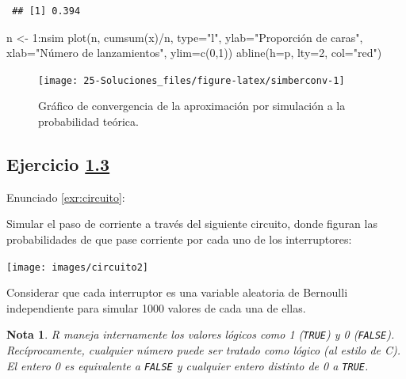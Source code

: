 \documentclass[
]{book}
\newenvironment{Shaded}{\begin{snugshade}}{\end{snugshade}}
\newcommand{\AttributeTok}[1]{\textcolor[rgb]{0.77,0.63,0.00}{#1}}
\newcommand{\DecValTok}[1]{\textcolor[rgb]{0.00,0.00,0.81}{#1}}
\newcommand{\FunctionTok}[1]{\textcolor[rgb]{0.00,0.00,0.00}{#1}}
\newcommand{\NormalTok}[1]{#1}
\newcommand{\OtherTok}[1]{\textcolor[rgb]{0.56,0.35,0.01}{#1}}
\newcommand{\SpecialCharTok}[1]{\textcolor[rgb]{0.00,0.00,0.00}{#1}}
\newcommand{\StringTok}[1]{\textcolor[rgb]{0.31,0.60,0.02}{#1}}
\theoremstyle{break}
\theoremstyle{nonumberplain}
\newtheorem{remark}{Nota}
\begin{document}
\begin{verbatim}
 ## [1] 0.394
\end{verbatim}

\begin{Shaded}
\begin{Highlighting}[]
\NormalTok{n }\OtherTok{\textless{}{-}} \DecValTok{1}\SpecialCharTok{:}\NormalTok{nsim}
\FunctionTok{plot}\NormalTok{(n, }\FunctionTok{cumsum}\NormalTok{(x)}\SpecialCharTok{/}\NormalTok{n, }\AttributeTok{type=}\StringTok{"l"}\NormalTok{, }\AttributeTok{ylab=}\StringTok{"Proporción de caras"}\NormalTok{, }
     \AttributeTok{xlab=}\StringTok{"Número de lanzamientos"}\NormalTok{, }\AttributeTok{ylim=}\FunctionTok{c}\NormalTok{(}\DecValTok{0}\NormalTok{,}\DecValTok{1}\NormalTok{))}
\FunctionTok{abline}\NormalTok{(}\AttributeTok{h=}\NormalTok{p, }\AttributeTok{lty=}\DecValTok{2}\NormalTok{, }\AttributeTok{col=}\StringTok{"red"}\NormalTok{)}
\end{Highlighting}
\end{Shaded}

\begin{figure}[!htb]

{\centering \texttt{[image: 25-Soluciones\_files/figure-latex/simberconv-1]} 

}

\caption{Gráfico de convergencia de la aproximación por simulación a la probabilidad teórica.}\label{fig:simberconv}
\end{figure}

\hypertarget{sol-circuito}{%
\subsection{\texorpdfstring{Ejercicio \href{ejercicios.html\#exr:circuito}{1.3}}{Ejercicio 1.3}}\label{sol-circuito}}

Enunciado \ref{exr:circuito}:

Simular el paso de corriente a través del siguiente circuito, donde
figuran las probabilidades de que pase corriente por cada uno de los
interruptores:

\begin{center}\texttt{[image: images/circuito2]} \end{center}

Considerar que cada interruptor es una variable aleatoria de Bernoulli independiente
para simular 1000 valores de cada una de ellas.

\begin{remark}
R maneja internamente los valores lógicos como 1 (\texttt{TRUE}) y 0 (\texttt{FALSE}).
Recíprocamente, cualquier número puede ser tratado como lógico (al estilo de C).
El entero 0 es equivalente a \texttt{FALSE} y cualquier entero distinto de 0 a \texttt{TRUE}.
\end{remark}
\end{document}

